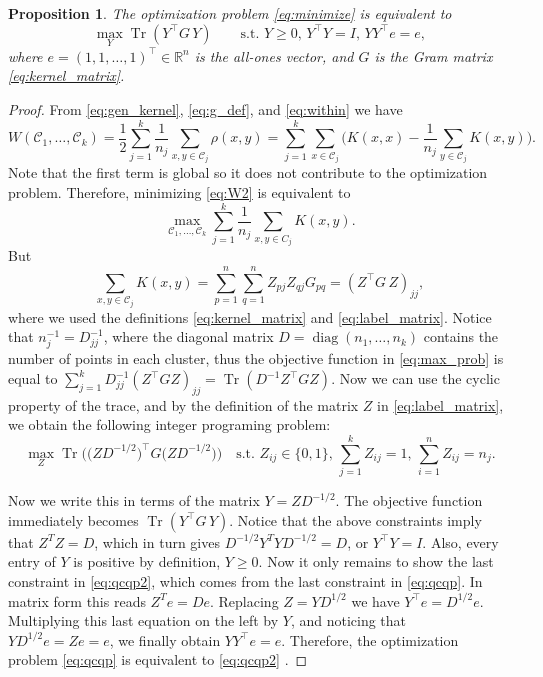 \documentclass[aps,preprint,nofootinbib,floatfix]{revtex4-1}
\newtheorem{proposition}[theorem]{Proposition}
\DeclareMathOperator{\diag}{diag}
\DeclareMathOperator{\Tr}{Tr}
\newcommand\kk{K}
\newcommand\C{{\mathcal{C}}}
\newcommand\Zt{Y}
\newcommand\e{e}
\begin{document}
\begin{proposition} 
\label{th:qcqp2}
The optimization problem \eqref{eq:minimize} is equivalent to
\begin{equation}
\label{eq:qcqp2}
\max_{\Zt} \Tr \left( \Zt^\top G \, \Zt \right)  \qquad
\mbox{s.t. $\Zt \ge 0$, $\Zt^\top \Zt = I$, 
$\Zt \Zt^\top \e = \e$},
\end{equation}
where $\e = (1,1,\dots,1)^\top \in \mathbb{R}^n$ is the all-ones vector,
and $G$ is the Gram matrix \eqref{eq:kernel_matrix}.
\end{proposition}
\begin{proof}
From 
\eqref{eq:gen_kernel},
\eqref{eq:g_def}, and
\eqref{eq:within}
we have
\begin{equation}
\label{eq:W2}
W(\C_1,\dotsc,\C_k  )
= \dfrac{1}{2} \sum_{j=1}^k \dfrac{1}{n_j} \sum_{x,y \in \C_j} \rho(x,y)
= \sum_{j=1}^k \sum_{x \in \C_j}  \bigg(
\kk(x,x) - \dfrac{1}{n_j} \sum_{y \in \C_j} \kk(x,y) \bigg).
\end{equation}
Note that the first term is global so it does not contribute to the 
optimization problem.
Therefore, minimizing \eqref{eq:W2} is equivalent to
\begin{equation}
\label{eq:max_prob}
\max_{ \C_1,\dotsc,\C_k } 
\sum_{j=1}^k \dfrac{1}{n_j} \sum_{x,y\in C_j} \kk(x,y) .
\end{equation}
But 
\begin{equation}
\sum_{x, y \in \C_j} \kk(x, y) =
\sum_{p=1}^{n} \sum_{q=1}^{n} Z_{pj} Z_{qj} G_{pq} = 
(Z^\top G \, Z)_{jj},
\end{equation}
where we used the definitions \eqref{eq:kernel_matrix} and
\eqref{eq:label_matrix}. 
Notice that $n_j^{-1} = D^{-1}_{jj}$, where the diagonal matrix $D = 
\diag(n_1,\dotsc,n_k)$ contains the number of points in each cluster, 
thus the objective function in 
\eqref{eq:max_prob} is equal to $\sum_{j=1}^k D^{-1}_{jj} 
\left( Z^\top G Z \right)_{jj} = \Tr \left( D^{-1} Z^\top G Z \right)$. 
Now we can
use the cyclic property
of the trace, and by the  definition of the matrix $Z$
in \eqref{eq:label_matrix}, we obtain the following integer
programing problem:
\begin{equation}\label{eq:qcqp}
\max_{Z} \Tr\Big( \big( Z D^{-1/2}\big)^\top G 
\big( ZD^{-1/2} \big) 
\Big) \quad
\mbox{s.t. $Z_{ij} \in \{0,1\}$, $\sum_{j=1}^k Z_{ij} = 1$, 
$\sum_{i=1}^n Z_{ij} = n_j$.}
\end{equation}

Now we write this in terms of the matrix $Y = Z D^{-1/2}$.
The objective function immediately becomes
$\Tr\left( Y^\top G \, Y\right)$. Notice that the above constraints
imply that $Z^T Z = D$, which in turn gives
$D^{-1/2} Y^T Y D^{-1/2} = D$, or $Y^\top Y = I$. 
Also, every entry of $Y$ is positive by definition,
$Y \ge 0$. Now it only remains to show the last 
constraint in \eqref{eq:qcqp2}, which comes from the last
constraint in \eqref{eq:qcqp}. In matrix form this reads
$Z^T \e = D \e$. Replacing $Z=YD^{1/2}$ we have
$Y^\top \e = D^{1/2} \e$. Multiplying this last equation
on the left by $Y$, and noticing
that $Y D^{1/2} \e = Z \e = \e$, we finally obtain
$Y Y^\top \e = \e$. Therefore, the optimization 
problem \eqref{eq:qcqp} is equivalent
to \eqref{eq:qcqp2} .
\end{proof}
\end{document}

